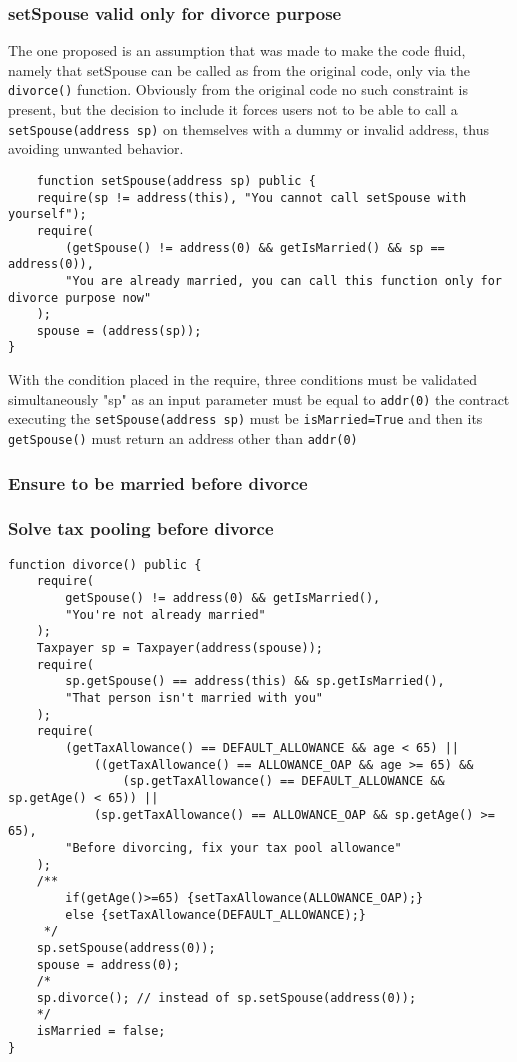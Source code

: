 \documentclass{article}
\begin{document}
\subsubsection{setSpouse valid only for divorce purpose}
The one proposed is an assumption that was made to make the code fluid, namely that setSpouse can be called as from the original code, only via the \texttt{divorce()} function. Obviously from the original code no such constraint is present, but the decision to include it forces users not to be able to call a \texttt{setSpouse(address sp)} on themselves with a dummy or invalid address, thus avoiding unwanted behavior.
\begin{verbatim}
    function setSpouse(address sp) public {
    require(sp != address(this), "You cannot call setSpouse with yourself");
    require(
        (getSpouse() != address(0) && getIsMarried() && sp == address(0)),
        "You are already married, you can call this function only for divorce purpose now"
    );
    spouse = (address(sp));
}
\end{verbatim}
With the condition placed in the require, three conditions must be validated simultaneously "sp" as an input parameter must be equal to \texttt{addr(0)} the contract executing the \texttt{setSpouse(address sp)}  must be \texttt{isMarried=True} and then its \texttt{getSpouse()} must return an address other than \texttt{addr(0)}
\subsubsection{Ensure to be married before divorce}
\subsubsection{Solve tax pooling before divorce}

\begin{verbatim}
function divorce() public {
    require(
        getSpouse() != address(0) && getIsMarried(),
        "You're not already married"
    );
    Taxpayer sp = Taxpayer(address(spouse));
    require(
        sp.getSpouse() == address(this) && sp.getIsMarried(),
        "That person isn't married with you"
    );
    require(
        (getTaxAllowance() == DEFAULT_ALLOWANCE && age < 65) ||
            ((getTaxAllowance() == ALLOWANCE_OAP && age >= 65) &&
                (sp.getTaxAllowance() == DEFAULT_ALLOWANCE && sp.getAge() < 65)) ||
            (sp.getTaxAllowance() == ALLOWANCE_OAP && sp.getAge() >= 65),
        "Before divorcing, fix your tax pool allowance"
    ); 
    /**
        if(getAge()>=65) {setTaxAllowance(ALLOWANCE_OAP);}
        else {setTaxAllowance(DEFAULT_ALLOWANCE);}
     */
    sp.setSpouse(address(0));
    spouse = address(0);
    /*
    sp.divorce(); // instead of sp.setSpouse(address(0));
    */
    isMarried = false;
}
\end{verbatim}
\end{document}
